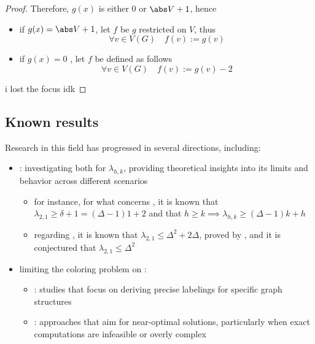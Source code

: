 \documentclass[a4paper, 12pt]{report}
\begin{document}
\begin{proof}
        Therefore, $g(x)$ is either 0 or $\abs V + 1$, hence

        \begin{itemize}
            \item if $g(x) = \abs V + 1$, let $f$ be $g$ restricted on $V$, thus $$\forall v \in V(G) \quad f(v) := g(v)$$
            \item if $g(x) = 0$ , let $f$ be defined as follows $$\forall v \in V(G) \quad f(v) := g(v) - 2$$
        \end{itemize}

        i lost the focus idk 
    \end{proof}

    \subsection{Known results}

    Research in this field has progressed in several directions, including:

    \begin{itemize}
        \item {}: investigating both  for $\lambda_{h, k}$, providing theoretical insights into its limits and behavior across different scenarios
            \begin{itemize}
                \item for instance, for what concerns , it is known that $\lambda_{2,1} \ge \delta + 1 = (\Delta - 1) 1 + 2$ and that $h \ge k \implies \lambda_{h, k} \ge (\Delta - 1) k + h$
                \item regarding , it is known that $\lambda_{2, 1} \le \Delta^2 + 2 \Delta$, proved by \textcite{griggs}, and it is conjectured that $\lambda_{2,1} \le \Delta^2$
            \end{itemize}
        \item limiting the coloring problem on :
            \begin{itemize}
                \item {}: studies that focus on deriving precise labelings for specific graph structures
                \item {}: approaches that aim for near-optimal solutions, particularly when exact computations are infeasible or overly complex
            \end{itemize}
    \end{itemize}
\end{document}

